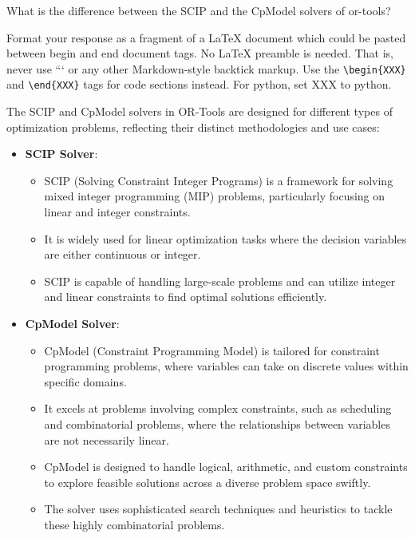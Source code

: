 \begin{ai}
What is the difference between the SCIP and the CpModel solvers of or-tools?

Format your response as a fragment of a LaTeX document which could be pasted
between begin and end document tags. No LaTeX preamble is needed.  That is,
never use ``` or any other Markdown-style backtick markup. Use the
\verb|\begin{XXX}| and \verb|\end{XXX}| tags for code sections instead. For
python, set XXX to python.
\end{ai}

\begin{airesult}
\vsp

The SCIP and CpModel solvers in OR-Tools are designed for different types of
optimization problems, reflecting their distinct methodologies and use cases:

\begin{itemize}
    \item \textbf{SCIP Solver}:
    \begin{itemize}
        \item SCIP (Solving Constraint Integer Programs) is a framework for
              solving mixed integer programming (MIP) problems, particularly
              focusing on linear and integer constraints.
        \item It is widely used for linear optimization tasks where the decision
              variables are either continuous or integer.
        \item SCIP is capable of handling large-scale problems and can utilize
              integer and linear constraints to find optimal solutions
              efficiently.
    \end{itemize}

    \item \textbf{CpModel Solver}:
    \begin{itemize}
        \item CpModel (Constraint Programming Model) is tailored for constraint
              programming problems, where variables can take on discrete values
              within specific domains.
        \item It excels at problems involving complex constraints, such as
              scheduling and combinatorial problems, where the relationships
              between variables are not necessarily linear.
        \item CpModel is designed to handle logical, arithmetic, and custom
              constraints to explore feasible solutions across a diverse problem
              space swiftly.
        \item The solver uses sophisticated search techniques and heuristics to
              tackle these highly combinatorial problems.
    \end{itemize}
\end{itemize}


\end{airesult}
